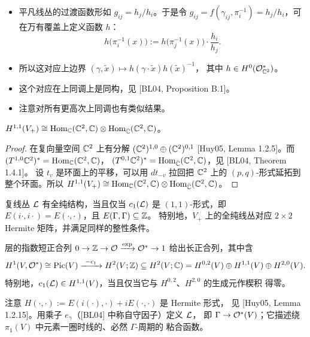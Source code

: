 
\begin{itemize}[leftmargin=2.2em,itemsep=0.25em]
\item 平凡线丛的过渡函数形如 $g_{ij}=h_j/h_i$。于是令
  $g_{ij}=f(\gamma_{ij},\pi_i^{-1})=h_j/h_i$，可在万有覆盖上定义函数 $h$：
  \[
  h\bigl(\pi_i^{-1}(x)\bigr) := h\bigl(\pi_j^{-1}(x)\bigr)\cdot\frac{h_i}{h_j}.
  \]
\item 所以这对应上边界 $(\gamma,\tilde x)\mapsto h(\gamma\cdot\tilde x)h(\tilde x)^{-1}$，
  其中 $h\in H^0(\mathcal{O}^*_{\mathbb{C}^2})$。
\item 这个对应在上同调上是同构，见 [BL04, Proposition B.1]。
\item 注意对所有更高次上同调也有类似结果。
\end{itemize}

\begin{claim}\label{claim:hodge-11}
$H^{1,1}(V_+)\cong\operatorname{Hom}_{\mathbb{C}}(\mathbb{C}^2,\mathbb{C})\otimes\operatorname{Hom}_{\bar{\mathbb{C}}}(\mathbb{C}^2,\mathbb{C})$。
\end{claim}

\begin{proof}
在复向量空间 $\mathbb{C}^2$ 上有分解 $(\mathbb{C}^2)^{1,0}\oplus(\mathbb{C}^2)^{0,1}$
[Huy05, Lemma 1.2.5]。而 $(T^{1,0}\mathbb{C}^2)^*=\operatorname{Hom}_{\mathbb{C}}(\mathbb{C}^2,\mathbb{C})$，
$(T^{0,1}\mathbb{C}^2)^*=\operatorname{Hom}_{\bar{\mathbb{C}}}(\mathbb{C}^2,\mathbb{C})$，见 [BL04, Theorem 1.4.1]。
设 $t_v$ 是环面上的平移，可以用 $dt_{-v}$ 拉回把 $\mathbb{C}^2$ 上的 $(p,q)$-形式延拓到
整个环面。所以
$H^{1,1}(V_+)\cong\operatorname{Hom}_{\mathbb{C}}(\mathbb{C}^2,\mathbb{C})\otimes\operatorname{Hom}_{\bar{\mathbb{C}}}(\mathbb{C}^2,\mathbb{C})$。\qedhere
\end{proof}

\begin{corollary}[{参看 [BL04, Proposition 2.1.6]}]\label{cor:holomorphic-structure}
复线丛 $\mathcal{L}$ 有全纯结构，当且仅当 $c_1(\mathcal{L})$ 是 $(1,1)$-形式，即
$E(i\cdot,i\cdot)=E(\cdot,\cdot)$，且 $E(\Gamma,\Gamma)\subseteq\mathbb{Z}$。
特别地，$V_+$ 上的全纯线丛对应 $2\times2$ Hermite 矩阵，并满足同样的整性条件。
\end{corollary}

\begin{remark}\label{rem:exponential-sequence}
层的指数短正合列 $0\to\mathbb{Z}\to\mathcal{O}\xrightarrow{\exp}\mathcal{O}^*\to1$ 给出长正合列，其中含
\[
H^1(V,\OO^*)\cong\mathrm{Pic}(V)\xrightarrow{\ -c_1\ }H^2(V;\Z)\subseteq H^2(V;\C)
=H^{0,2}(V)\oplus H^{1,1}(V)\oplus H^{2,0}(V).
\]
特别地，$c_1(\mathcal{L})\in H^{1,1}(V)$，当且仅当它与 $H^{0,2}$、$H^{2,0}$ 的生成元作楔积
得零。

注意 $H(\cdot,\cdot) := E(i(\cdot),\cdot)+iE(\cdot,\cdot)$ 是 Hermite 形式，
见 [Huy05, Lemma 1.2.15]。用乘子 $e_\gamma$（[BL04] 中称自守因子）定义 $\mathcal{L}$，
即 $\Gamma\to\mathcal{O}^*(V)$；它描述绕 $\pi_1(V)$ 中元素一圈时线的、必然 $\Gamma$-周期的
粘合函数。
\end{remark}

